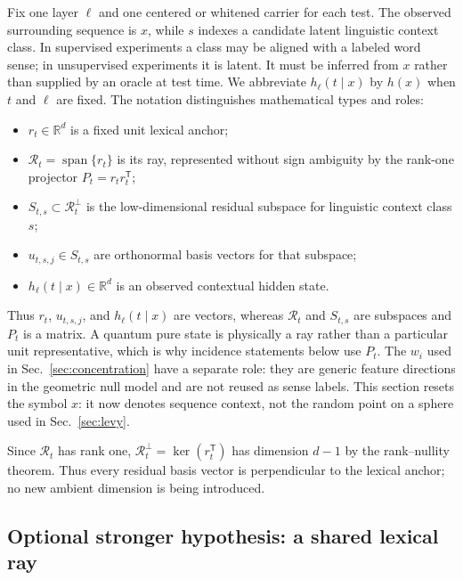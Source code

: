 \documentclass[
  aps,
  reprint,
  superscriptaddress,
  floatfix,
  nofootinbib,
  longbibliography
]{revtex4-2}
\newcommand{\R}{\mathbb{R}}
\newcommand{\T}{^{\mathsf{T}}}
\DeclareMathOperator{\spanop}{span}
\begin{document}
Fix one layer $\ell$ and one centered or whitened carrier for each test.  The
observed surrounding sequence is $x$, while $s$ indexes a candidate latent
linguistic context class.  In supervised experiments a class may be aligned with a
labeled word sense; in unsupervised experiments it is latent.  It must be
inferred from $x$ rather than supplied by an oracle at test time.  We
abbreviate $h_\ell(t\mid x)$ by $h(x)$ when $t$ and $\ell$ are fixed.  The
notation distinguishes mathematical types and roles:
%
\begin{itemize}
\item $r_t\in\R^d$ is a fixed unit lexical anchor;
\item $\mathcal R_t=\spanop\{r_t\}$ is its ray, represented without sign
  ambiguity by the rank-one projector $P_t=r_t r_t\T$;
\item $S_{t,s}\subset\mathcal R_t^\perp$ is the low-dimensional residual
  subspace for linguistic context class $s$;
\item $u_{t,s,j}\in S_{t,s}$ are orthonormal basis vectors for that subspace;
\item $h_\ell(t\mid x)\in\R^d$ is an observed contextual hidden state.
\end{itemize}
%
Thus $r_t$, $u_{t,s,j}$, and $h_\ell(t\mid x)$ are vectors, whereas
$\mathcal R_t$ and $S_{t,s}$ are subspaces and $P_t$ is a matrix.  A quantum
pure state is physically a ray rather than a particular unit representative,
which is why incidence statements below use $P_t$.  The $w_i$ used in
Sec.~\ref{sec:concentration} have a separate role: they are generic feature
directions in the geometric null model and are not reused as sense labels.
This section resets the symbol $x$: it now denotes sequence context, not the
random point on a sphere used in Sec.~\ref{sec:levy}.

Since $\mathcal R_t$ has rank one,
$\mathcal R_t^\perp=\ker(r_t\T)$ has dimension $d-1$ by the rank--nullity
theorem.  Thus every residual basis vector is perpendicular to the lexical
anchor; no new ambient dimension is being introduced.

\subsection{Optional stronger hypothesis: a shared lexical ray}
\label{sec:reference-hypothesis}
\end{document}
